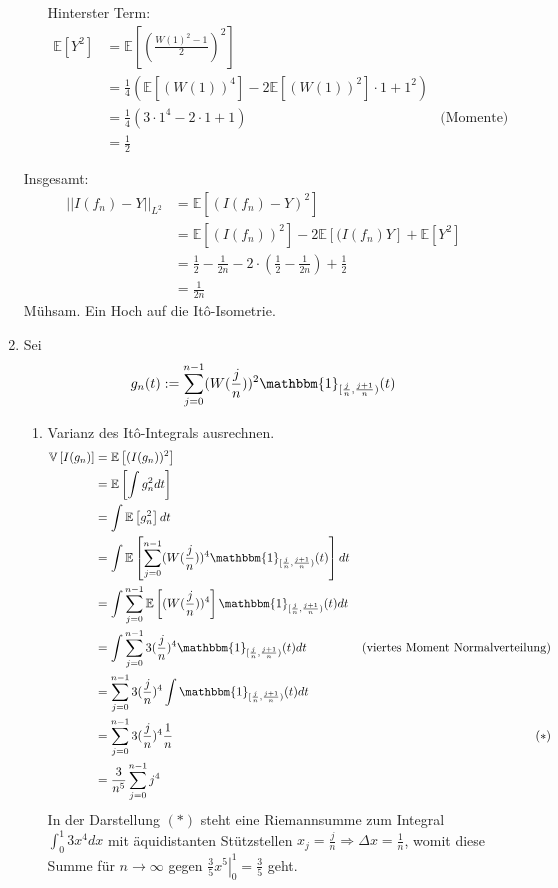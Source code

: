 \documentclass[a4paper,11pt,notitlepage,fullpage]{article}
\newcommand{\Ee}[1]{\mathbb E\left[#1\right]}
\newcommand{\Vv}[1]{\mathbb V\left[#1\right]}
\newcommand{\indd}[1]{\mathbbm{1}_{#1}}
\newcommand{\norm}[2]{\left|\left|{#1}\right|\right|_{#2}}
\begin{document}
\begin{enumerate}
\begin{enumerate}
Hinterster Term:
\begin{align*}
\Ee{Y^2} &= \Ee{\left(\frac{W(1)^2-1}{2}\right)^2}\\
&= \frac{1}{4}\left(\Ee{(W(1))^4} -2\Ee{(W(1))^2}\cdot 1 +1^2\right)\\
&= \frac{1}{4}\left(3\cdot 1^4 -2\cdot 1 +1\right) &\text{(Momente)}\\
&= \frac{1}{2}
\end{align*}
\end{enumerate}

Insgesamt:
\begin{align*}
\norm{I(f_n)-Y}{L^2} &= \Ee{(I(f_n) - Y)^2}\\
&= \Ee{(I(f_n))^2} -2\Ee{(I(f_n)Y} + \Ee{Y^2}\\
&=\frac{1}{2} - \frac{1}{2n} - 2\cdot\left(\frac{1}{2} - \frac{1}{2n}\right) +\frac{1}{2}\\
&= \frac{1}{2n}
\end{align*}
Mühsam. Ein Hoch auf die Itô-Isometrie.
\item Sei
$$g_n(t) := \sum_{j=0}^{n-1} (W(\frac{j}{n}))^2 \indd{[\frac{j}{n}, \frac{j+1}{n})}(t)$$
\begin{enumerate}
\item Varianz des Itô-Integrals ausrechnen.
\begin{align*}
\Vv{I(g_n)} &= \Ee{(I(g_n))^2}\\
&=\Ee{\int g_n^2 dt}\\
&= \int \Ee{g_n^2} dt\\
&= \int \Ee{\sum_{j=0}^{n-1} (W(\frac{j}{n}))^4 \indd{[\frac{j}{n}, \frac{j+1}{n})}(t)} dt\\
&= \int \sum_{j=0}^{n-1} \Ee{(W(\frac{j}{n}))^4} \indd{[\frac{j}{n}, \frac{j+1}{n})}(t) dt\\
&= \int \sum_{j=0}^{n-1} 3(\frac{j}{n})^4 \indd{[\frac{j}{n}, \frac{j+1}{n})}(t) dt &\text{(viertes Moment Normalverteilung)}\\
&= \sum_{j=0}^{n-1} 3(\frac{j}{n})^4 \int \indd{[\frac{j}{n}, \frac{j+1}{n})}(t) dt\\
&= \sum_{j=0}^{n-1} 3(\frac{j}{n})^4 \frac{1}{n} &(*)\\
&= \frac{3}{n^5} \sum_{j=0}^{n-1} j^4 \\
\end{align*}
In der Darstellung $(*)$ steht eine Riemannsumme zum Integral $\int_0^1 3x^4 dx$ mit äquidistanten Stützstellen $x_j = \frac{j}{n} \Rightarrow \Delta x = \frac{1}{n}$, womit diese Summe für $n\rightarrow \infty$ gegen $\left. \frac{3}{5}x^5\right|_0^1 = \frac{3}{5}$ geht.


\end{enumerate}
\end{enumerate}
\end{document}
